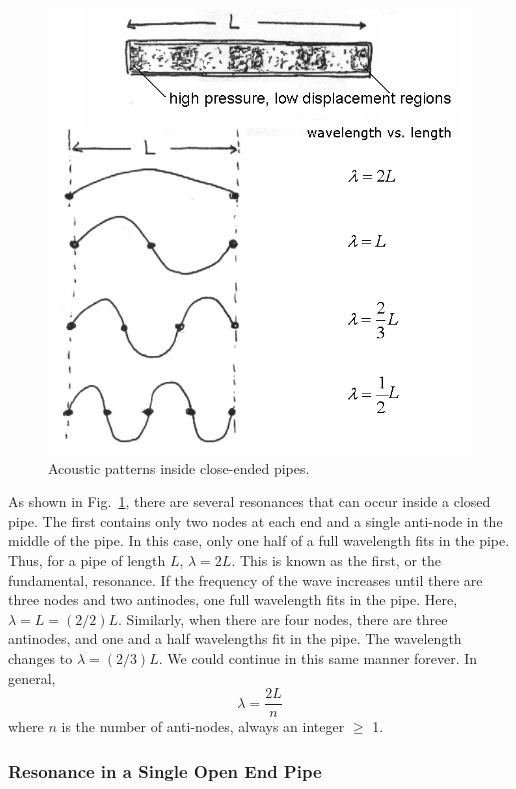 \begin{figure}[htb]
	\centering
	\includegraphics[width=5.0in]{./figures/Topic3/Fig3-3.png}
	\caption{Acoustic patterns inside close-ended pipes.}
 	\label{Fig3-3}
\end{figure}
As shown in Fig.~\ref{Fig3-3}, there are several resonances that can occur inside a closed pipe. The first contains only two nodes at each end and a single anti-node in the middle of the pipe.  In this case, only one half of a full wavelength fits in the pipe.  Thus, for a pipe of length $L$, $\lambda = 2L$.  This is known as the first, or the fundamental, resonance.  If the frequency of the wave increases until there are three nodes and two antinodes, one full wavelength fits in the pipe.  Here, $\lambda = L = (2/2)L$.  Similarly, when there are four nodes, there are three antinodes, and one and a half wavelengths fit in the pipe.  The wavelength changes to $\lambda = (2/3)L$.  We could continue in this same manner forever.  In general, 
\begin{equation}\label{eqn3-7}
\lambda = \frac{2L}{n}
\end{equation}
where $n$ is the number of anti-nodes, always an integer $\geq$ 1. 

\subsubsection{Resonance in a Single Open End Pipe}

